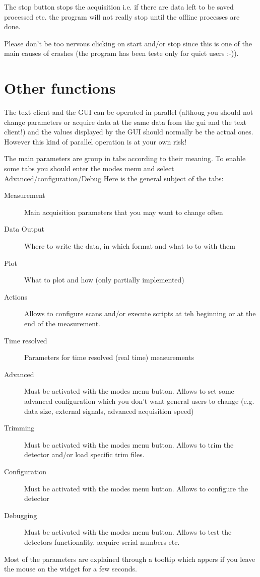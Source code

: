 \documentclass{report}
\begin{document}
The stop button stops the acquisition i.e. if there are data left to be saved processed etc. the program will not really stop until the offline processes are done.

Please don't be too nervous clicking on start and/or stop since this is one of the main causes of crashes (the program has been teste only for quiet users :-)).

\section{Other functions}
The text client and the GUI can be operated in parallel (althoug you should not change parameters or acquire data at the same data from the gui and the text client!) and the values displayed by the GUI should normally be the actual ones. 
However this kind of parallel operation is at your own risk!


The main parameters are group in tabs according to their meaning. To enable some tabs you should enter the modes menu and select Advanced/configuration/Debug
Here is the general subject of the tabs:
\begin{description}
\item[Measurement] Main acquisition parameters that you may want to change often
\item[Data Output] Where to write the data, in which format and what to to with them
\item[Plot] What to plot and how (only partially implemented)
\item[Actions] Allows to configure scans and/or execute scripts at teh beginning or at the end of the measurement.
\item[Time resolved] Parameters for time resolved (real time) measurements
\item[Advanced] Must be activated with the modes menu button. Allows to set some advanced configuration which you don't want general users to change (e.g. data size, external signals, advanced acquisition speed)
\item[Trimming] Must be activated with the modes menu button. Allows to trim the detector and/or load specific trim files.
\item[Configuration] Must be activated with the modes menu button. Allows to configure the detector
\item[Debugging]  Must be activated with the modes menu button. Allows to test the detectors functionality, acquire serial numbers etc.
\end{description}
Most of the parameters are explained through a tooltip which appers if you leave the mouse on the widget for a few seconds.
\end{document}
